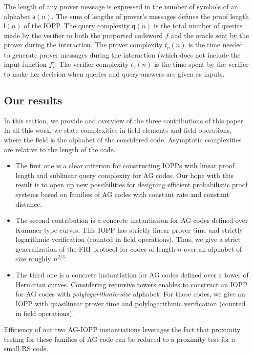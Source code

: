 \documentclass[a4paper,USenglish,autoref]{lipics-v2021}
\begin{document}
The length of any prover message is expressed in the number of symbols of an alphabet $\mathsf{a}(n)$. The sum of lengths of prover's messages defines the proof length $\mathsf{l}(n)$ of the IOPP. The query complexity $\mathsf{q}(n)$ is the total number of queries made by the verifier to both the purported codeword $f$ and the oracle sent by the prover during the interaction. The prover complexity $t_p(n)$ is the time needed to generate prover messages during the interaction (which does not include the input function $f$). The verifier complexity $t_v(n)$ is the time spent by the verifier to make her decision when queries and query-answers are given as inputs.  


\subsection{Our results}
In this section, we provide and overview of the three contributions of this paper. In all this work, we state complexities in field elements and field operations, where the field is the alphabet of the considered code. Asymptotic complexities are relative to the length of the code.

\begin{itemize}
	\item The first one is a clear criterion for constructing IOPPs with linear proof length and sublinear query complexity for AG codes. Our hope with this result is to open up new possibilities for designing efficient probabilistic proof systems based on families of AG codes with constant rate and constant distance.
	\item The second contribution is a concrete instantiation for AG codes defined over Kummer-type curves. This IOPP has strictly linear prover time and strictly logarithmic verification (counted in field operations). Thus, we give a strict generalization of the \textsf{FRI} protocol for codes of length $n$ over an alphabet of size roughly $n^{2/3}$.
	\item The third one is a concrete instantiation for AG codes defined over a tower of Hermitian curves. Considering recursive towers enables to construct an IOPP for AG codes with \emph{polylogarithmic-size} alphabet. For those codes, we give an IOPP with quasilinear prover time and polylogarithmic verification (counted in field operations).
\end{itemize}

Efficiency of our two AG-IOPP instantiations leverages the fact that proximity testing for these families of AG code can be reduced to a proximity test for a small RS code.
\end{document}
